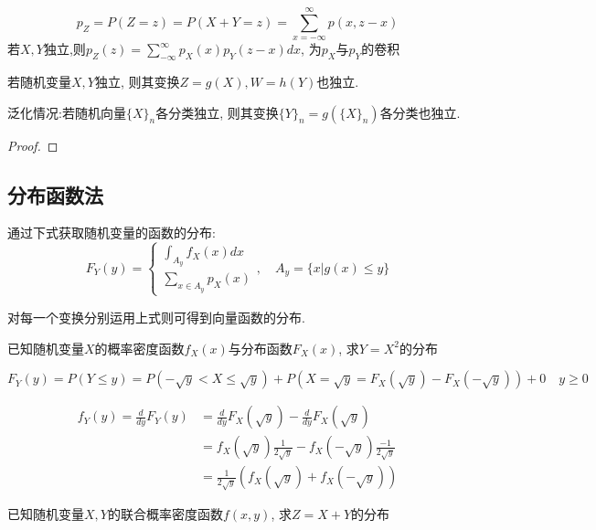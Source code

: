 \begin{solution}
    \[ p_Z=P(Z=z)=P(X+Y=z)=\sum_{x=-\infty}^{\infty}p(x, z-x) \]
    若$X,Y$独立,则$p_Z(z)=\sum_{-\infty}^{\infty}p_X(x)p_Y(z-x)dx$, 为$p_X$与$p_Y$的卷积
\end{solution}

\begin{theorem}[]
    若随机变量$X,Y$独立, 则其变换$Z=g(X), W=h(Y)$也独立.

    泛化情况:若随机向量$\{X\}_n$各分类独立, 则其变换$\{Y\}_n=g(\{X\}_n)$各分类也独立.
\end{theorem}

\begin{proof}
\end{proof}

\subsection{分布函数法}

通过下式获取随机变量的函数的分布:
\[ F_Y(y)=\begin{cases}
        \int_{A_y}f_X(x)dx \\
        \sum_{x \in A_y}p_X(x)
    \end{cases} , \quad A_y=\{ x|g(x)\le y \}
\]

对每一个变换分别运用上式则可得到向量函数的分布.

\begin{example}
    已知随机变量$X$的概率密度函数$f_X(x)$与分布函数$F_X(x)$, 求$Y=X^2$的分布
\end{example}

\begin{solution}
    \[ F_Y(y)=P(Y\le y)=P(-\sqrt{y}<X\le \sqrt{y})+P(X=\sqrt{y}=F_X(\sqrt{y})-F_X(-\sqrt{y}))+0 \quad y\ge 0\]

    \begin{align*}
        f_Y(y) =\frac{d}{dy}F_Y(y) & =\frac{d}{dy}F_X(\sqrt{y}) -\frac{d}{dy}F_X(\sqrt{y})                 \\
                                   & =f_X(\sqrt{y})\frac{1}{2\sqrt{y}} -f_X(-\sqrt{y})\frac{-1}{2\sqrt{y}} \\
                                   & =\frac{1}{2\sqrt{y}}(f_X(\sqrt{y})+f_X(-\sqrt{y}))
    \end{align*}
\end{solution}

\begin{example}\label{exp:sum_of_pdf}
    已知随机变量$X,Y$的联合概率密度函数$f(x,y)$, 求$Z=X+Y$的分布
\end{example}

